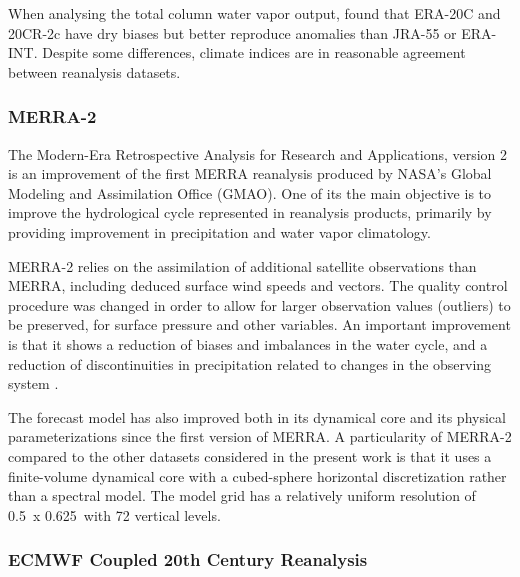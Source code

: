 \documentclass{ametsoc}
\begin{document}
When analysing the total column water vapor output, \citet{Poli2016} found that ERA-20C and 20CR-2c have dry biases but better reproduce anomalies than JRA-55 or ERA-INT. Despite some differences, climate indices are in reasonable agreement between reanalysis datasets.


\subsubsection{MERRA-2}

The Modern-Era Retrospective Analysis for Research and Applications, version 2  \citep[MERRA-2, ][]{Gelaro2017} is an improvement of the first MERRA reanalysis \citep{Rienecker2011} produced by NASA's Global Modeling and Assimilation Office (GMAO). One of its the main objective is to improve the hydrological cycle represented in reanalysis products, primarily by providing improvement in precipitation and water vapor climatology.

MERRA-2 relies on the assimilation of additional satellite observations than MERRA, including deduced surface wind speeds and vectors. The quality control procedure was changed in order to allow for larger observation values (outliers) to be preserved, for surface pressure and other variables. An important improvement is that it shows a reduction of biases and imbalances in the water cycle, and a reduction of discontinuities in precipitation related to changes in the observing system \citep{Gelaro2017}.

The forecast model has also improved both in its dynamical core and its physical parameterizations since the first version of MERRA. A particularity of MERRA-2 compared to the other datasets considered in the present work is that it uses a finite-volume dynamical core with a cubed-sphere horizontal discretization rather than a spectral model. The model grid has a relatively uniform resolution of 0.5\degree\ x 0.625\degree\ with 72 vertical levels.


\subsubsection{ECMWF Coupled 20th Century Reanalysis}
\end{document}
